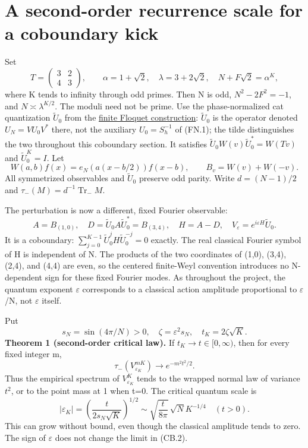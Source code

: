 \section{A second-order recurrence scale for a coboundary kick}\label{sec:coboundary}
Set \[
 T=\begin{pmatrix}3&2\\4&3\end{pmatrix},\qquad
 \alpha=1+\sqrt2,\quad \lambda=3+2\sqrt2,\quad
 N+F\sqrt2=\alpha^K,
\] where K tends to infinity through odd primes. Then N is odd, \(N^2-2F^2=-1\), and \(N\asymp\lambda^{K/2}\). The moduli need not be prime. Use the phase-normalized cat quantization \(\widetilde U_0\) from the \hyperref[sec:floquet]{finite Floquet construction}: \(\widetilde U_0\) is the operator denoted \(U_N=VU_0V^*\) there, not the auxiliary \(U_0=S_h^{-1}\) of (FN.1); the tilde distinguishes the two throughout this coboundary section. It satisfies \(\widetilde U_0W(v)\widetilde U_0^*=W(Tv)\) and \(\widetilde U_0^K=I\). Let \[
 W(a,b)f(x)=e_N(a(x-b/2))f(x-b),\qquad B_v=W(v)+W(-v).
\] All symmetrized observables and \(\widetilde U_0\) preserve odd parity. Write \(d=(N-1)/2\) and \(\tau_-(M)=d^{-1}\operatorname{Tr}_{-}M\).

The perturbation is now a different, fixed Fourier observable: \[
 A=B_{(1,0)},\quad D=\widetilde U_0A\widetilde U_0^*=B_{(3,4)},\quad
 H=A-D,\quad V_\varepsilon=e^{i\varepsilon H}\widetilde U_0.                 \tag{CB.1}
\] It is a coboundary: \(\sum_{j=0}^{K-1}\widetilde U_0^jH\widetilde U_0^{-j}=0\) exactly. The real classical Fourier symbol of H is independent of N. The products of the two coordinates of (1,0), (3,4), (2,4), and (4,4) are even, so the centered finite-Weyl convention introduces no N-dependent sign for these fixed Fourier modes. As throughout the project, the quantum exponent \(\varepsilon\) corresponds to a classical action amplitude proportional to \(\varepsilon\)/N, not \(\varepsilon\) itself.

Put \[
 s_N=\sin(4\pi/N)>0,\quad \zeta=\varepsilon^2s_N,\quad
 t_K=2\zeta\sqrt K.
\] \textbf{Theorem 1 (second-order critical law).} If \(t_K\to t\in[0,\infty)\), then for every fixed integer m, \[
 \tau_-(V_{\varepsilon_K}^{mK})\longrightarrow e^{-m^2t^2/2}.     \tag{CB.2}
\] Thus the empirical spectrum of \(V_{\varepsilon_K}^K\) tends to the wrapped normal law of variance \(t^2\), or to the point mass at 1 when t=0. The critical quantum scale is \[
 |\varepsilon_K|=\left(\frac{t}{2s_N\sqrt K}\right)^{1/2}
 \sim\sqrt{\frac{t}{8\pi}}\,\sqrt N K^{-1/4}\quad(t>0).         \tag{CB.3}
\] This can grow without bound, even though the classical amplitude tends to zero. The sign of \(\varepsilon\) does not change the limit in (CB.2).

